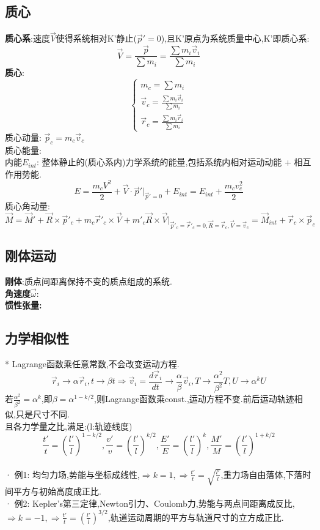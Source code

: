 \documentclass{article}
\begin{document}
\subsection{质心}
\textbf{质心系}:\exists 速度$\vec V$使得系统相对K'静止($\vec p' = 0$),且K'原点为系统质量中心,K'即质心系:
\[\vec V = \frac{\vec p}{\sum m_i} = \frac{\sum m_i \vec v_i}{\sum m_i}\]
\textbf{质心}: 
\begin{displaymath}
    \left\{ \begin{array}{ll}
    m_c = \sum m_i\\
    \vec v_c = \frac{\sum m_i \vec v_i}{\sum m_i}\\
    \vec r_c = \frac{\sum m_i \vec r_i}{\sum m_i}
    \end{array} \right.
\end{displaymath}
质心动量: $\vec p_c = m_c \vec v_c$\\
质心能量: \\
内能$E_{int}$: 整体静止的(质心系内)力学系统的能量,包括系统内相对运动动能 + 相互作用势能.\\
\[E = \frac{m_c V^2}{2} + \vec V \cdot \vec p' |_{\vec p'=0} + E_{int} = E_{int} + \frac{m_c v_c^2}{2}\]
质心角动量: 
\[\vec M = \vec M' + \vec R \times \vec p'_c + m_c \vec r'_c \times \vec V + m'_c \vec R \times \vec V|_{\vec p'_c =\vec r'_c = 0, \vec R =\vec r_c, \vec V =\vec v_c}
 = \vec M_{int} + \vec r_c \times \vec p_c \]


\subsection{刚体运动}
\textbf{刚体}:质点间距离保持不变的质点组成的系统.\\
\textbf{角速度$\vec \omega:$}\\
\textbf{惯性张量:}


\subsection{力学相似性}
* Lagrange函数乘任意常数,不会改变运动方程.
\[\vec r_i \to \alpha \vec r_i, t \to \beta t 
 \Rightarrow \vec v_i = \frac{d\vec r_i}{dt} \to \frac{\alpha}{\beta}\vec v_i,T \to \frac{\alpha^2}{\beta^2}T,U \to  \alpha^k U\]
若$\frac{\alpha^2}{\beta^2} = \alpha ^ k $,即$\beta = \alpha^{1-k/2}$,则Lagrange函数乘const.,运动方程不变.前后运动轨迹相似,只是尺寸不同.\\
且各力学量之比,满足:\quad(l:轨迹线度)
\[\frac{t'}{t} = (\frac{l'}{l})^{1-k/2},\frac{v'}{v} = (\frac{l'}{l})^{k/2},\frac{E'}{E} = (\frac{l'}{l})^k,\frac{M'}{M} = (\frac{l'}{l})^{1+k/2}\]\\
· 例1: 均匀力场,势能与坐标成线性,$\Rightarrow k=1,\Rightarrow \frac{t'}{t} = \sqrt{\frac{l'}{l}}$,重力场自由落体,下落时间平方与初始高度成正比.\\
· 例2: Kepler's第三定律,Newton引力、Coulomb力,势能与两点间距离成反比,$\Rightarrow k=-1,\Rightarrow \frac{t'}{t} = (\frac{l'}{l})^{3/2}$,轨道运动周期的平方与轨道尺寸的立方成正比.\\
\end{document}
